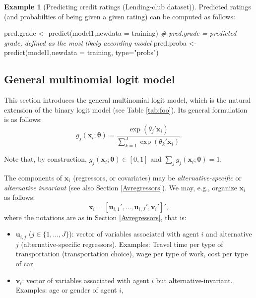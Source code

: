 \documentclass[
  12pt,
]{book}
\newenvironment{Shaded}{\begin{snugshade}}{\end{snugshade}}
\newcommand{\AttributeTok}[1]{\textcolor[rgb]{0.77,0.63,0.00}{#1}}
\newcommand{\CommentTok}[1]{\textcolor[rgb]{0.56,0.35,0.01}{\textit{#1}}}
\newcommand{\FunctionTok}[1]{\textcolor[rgb]{0.00,0.00,0.00}{#1}}
\newcommand{\NormalTok}[1]{#1}
\newcommand{\OtherTok}[1]{\textcolor[rgb]{0.56,0.35,0.01}{#1}}
\newcommand{\StringTok}[1]{\textcolor[rgb]{0.31,0.60,0.02}{#1}}
\providecommand{\tightlist}{%
  \setlength{\itemsep}{0pt}\setlength{\parskip}{0pt}}
\theoremstyle{definition}
\theoremstyle{definition}
\newtheorem{example}{Example}[chapter]
\theoremstyle{definition}
\theoremstyle{definition}
\theoremstyle{remark}
\begin{document}
\begin{example}[Predicting credit ratings (Lending-club dataset)]
Predicted ratings (and probabilties of being given a given rating) can be computed as follows:

\begin{Shaded}
\begin{Highlighting}[]
\NormalTok{pred.grade }\OtherTok{\textless{}{-}} \FunctionTok{predict}\NormalTok{(model1,}\AttributeTok{newdata =}\NormalTok{ training)}
\CommentTok{\# pred.grade = predicted grade, defined as the most likely according model}
\NormalTok{pred.proba }\OtherTok{\textless{}{-}} \FunctionTok{predict}\NormalTok{(model1,}\AttributeTok{newdata =}\NormalTok{ training, }\AttributeTok{type=}\StringTok{"probs"}\NormalTok{)}
\end{Highlighting}
\end{Shaded}

\end{example}

\hypertarget{MNL}{%
\subsection{General multinomial logit model}\label{MNL}}

This section introduces the general multinomial logit model, which is the natural extension of the binary logit model (see Table \ref{tab:foo}). Its general formulation is as follows:
\begin{equation}
g_j(\mathbf{x}_i;\boldsymbol\theta) = \frac{\exp(\theta_j'\mathbf{x}_i)}{\sum_{k=1}^J \exp(\theta_k'\mathbf{x}_i)}.\label{eq:GeneralMNL}
\end{equation}

Note that, by construction, \(g_j(\mathbf{x}_i;\boldsymbol\theta) \in [0,1]\) and \(\sum_{j}g_j(\mathbf{x}_i;\boldsymbol\theta)=1\).

The components of \(\mathbf{x}_i\) (regressors, or covariates) may be \emph{alternative-specific} or \emph{alternative invariant} (see also Section \ref{Avregressors}). We may, e.g., organize \(\mathbf{x}_i\) as follows:
\begin{equation}
\mathbf{x}_i = [\mathbf{u}_{i,1}',\dots,\mathbf{u}_{i,J}',\mathbf{v}_{i}']',\label{eq:xorganiz}
\end{equation}
where the notations are as in Section \ref{Avregressors}, that is:

\begin{itemize}
\tightlist
\item
  \(\mathbf{u}_{i,j}\) (\(j \in \{1,\dots,J\}\)): vector of variables associated with agent \(i\) and alternative \(j\) (alternative-specific regressors). Examples: Travel time per type of transportation (transportation choice), wage per type of work, cost per type of car.
\item
  \(\mathbf{v}_{i}\): vector of variables associated with agent \(i\) but alternative-invariant. Examples: age or gender of agent \(i\),
\end{itemize}
\end{document}
